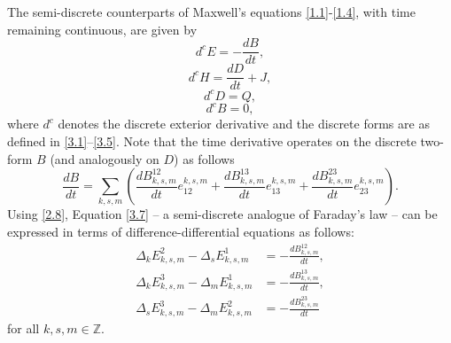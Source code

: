 \documentclass[english]{article}
\theoremstyle{plain}
\theoremstyle{definition}
\theoremstyle{remark}
\numberwithin{equation}{section}
\begin{document}
The semi-discrete counterparts of  Maxwell's equations \eqref{1.1}-\eqref{1.4},  with time remaining continuous,  are given by
\begin{equation}\label{3.7}
  d^c E=-\frac{dB}{dt},
 \end{equation}
 \begin{equation}\label{3.8}
 d^cH=\frac{d D}{dt}+J,
 \end{equation}
 \begin{equation}\label{3.9}
 d^cD=Q,
 \end{equation}
 \begin{equation}\label{3.10}
 d^cB=0,
 \end{equation}
 where
$d^c$  denotes the discrete exterior derivative and the discrete forms are  as defined in \eqref{3.1}–\eqref{3.5}.
Note that the time derivative  operates on the discrete two-form $B$
 (and analogously on $D$)
 as follows
\begin{equation*}
\frac{dB}{dt}=\sum_{k,s,m}\left(\frac{dB^{12}_{k,s,m}}{dt}e_{12}^{k,s,m}+\frac{dB^{13}_{k,s,m}}{dt}e_{13}^{k,s,m}+\frac{dB^{23}_{k,s,m}}{dt}e_{23}^{k,s,m}\right).
\end{equation*}
Using \eqref{2.8},  Equation \eqref{3.7} -- a semi-discrete analogue of Faraday’s law -- can be expressed in terms of difference-differential equations as follows:
\begin{align*}
\Delta_k E^2_{k,s,m} - \Delta_s E^1_{k,s,m} &= -\frac{dB^{12}_{k,s,m}}{dt}, \\
\Delta_k E^3_{k,s,m} - \Delta_m E^1_{k,s,m} &= -\frac{dB^{13}_{k,s,m}}{dt}, \\
\Delta_s E^3_{k,s,m} - \Delta_m E^2_{k,s,m} &= -\frac{dB^{23}_{k,s,m}}{dt}
\end{align*}
for all $k,s,m\in\mathbb{Z}$.
\end{document}
